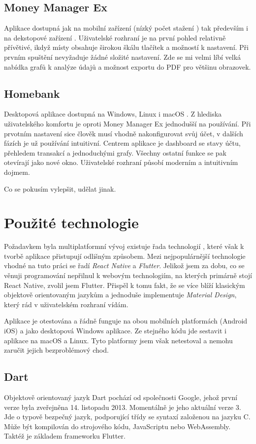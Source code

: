 \documentclass[
  biblatex,
  figures=true,
  tables=false,
  glossaries,
  index
]{kidiplom}
\begin{document}
\subsection{Money Manager Ex}
Aplikace dostupná jak na mobilní zařízení (nízký počet stažení \cite{money-manager-android}) tak především i na dekstopové zařízení \cite{money-manager}. Uživatelské rozhraní je na první pohled relativně přívětivé, ikdyž místy obsahuje širokou škálu tlačítek a možností k nastavení. Při prvním spuštění nevyžaduje žádné složité nastavení. Zde se mi velmi líbí velká nabídka grafů k analýze údajů a možnost exportu do PDF pro většinu obrazovek.

\subsection{Homebank}
Desktopová aplikace dostupná na Windows, Linux i macOS \cite{homebank}. Z hlediska uživatelského komfortu je oproti Money Manager Ex jednodušší na používání. Při prvotním nastavení sice člověk musí vhodně nakonfigurovat svůj účet, v dalších fázích je už používání intuitivní. Centrem aplikace je dashboard se stavy účtu, přehledem transakcí a jednoduchými grafy. Všechny ostatní funkce se pak otevírají jako nové okno. Uživatelské rozhraní působí moderním a intuitivním dojmem.

Co se pokusím vylepšit, udělat jinak.

\section{Použité technologie}

Požadavkem byla multiplatformní vývoj existuje řada technologií \cite{jetbrains-crossplatform}, které však k tvorbě aplikace přistupují odlišným způsobem. Mezi nejpopulárnější technologie vhodné na tuto práci se řadí \textit{React Native} a \textit{Flutter}. Jelikož jsem za dobu, co se věnuji programování nepřilnul k webovým technologiím, na kterých primárně stojí React Native, zvolil jsem Flutter. Přispěl k tomu fakt, že se více blíží klasickým objektově orientovaným jazykům a jednoduše implementuje \textit{Material Design}, který rád v uživatelském rozhraní vídám.

Aplikace je otestována a řádně funguje na obou mobilních platformách (Android iOS) a jako desktopová Windows aplikace. Ze stejného kódu jde sestavit i aplikace na macOS a Linux. Tyto platformy jsem však netestoval a nemohu zaručit jejich bezproblémový chod.

\subsection{Dart}
Objektově orientovaný jazyk Dart \cite{dart} pochází od společnosti Google, jehož první verze byla zveřejněna 14. listopadu 2013. Momentálně je jeho aktuální verze 3. Jde o typově bezpečný jazyk, podporující třídy se syntaxí založenou na jazyku C. Může být kompilován do strojového kódu, JavaScriptu nebo WebAssembly. Taktéž je základem frameworku Flutter.
\end{document}

